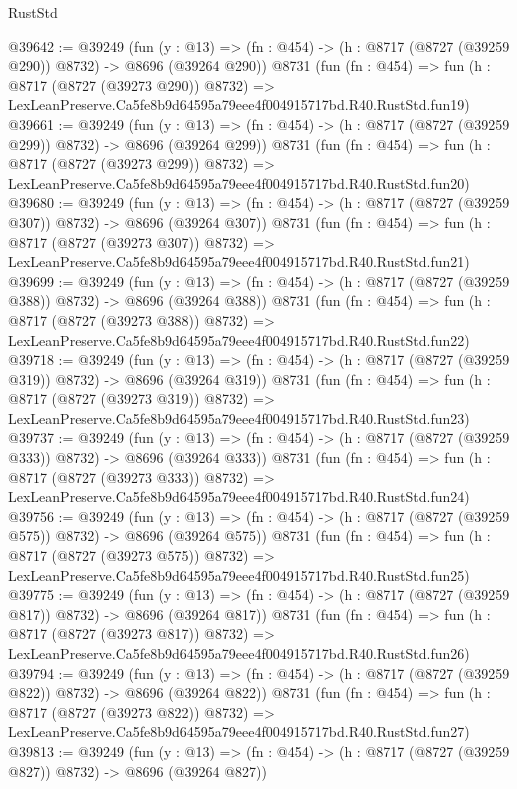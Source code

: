 \begin{lexlean}{RustStd}
\begin{coremodule}
@39642 := @39249
    (fun (y : @13) => (fn : @454) -> (h : @8717 (@8727 (@39259 @290)) @8732) -> @8696 (@39264 @290))
    @8731
    (fun (fn : @454) =>
    fun (h : @8717 (@8727 (@39273 @290)) @8732) =>
    LexLeanPreserve.Ca5fe8b9d64595a79eee4f004915717bd.R40.RustStd.fun19)
@39661 := @39249
    (fun (y : @13) => (fn : @454) -> (h : @8717 (@8727 (@39259 @299)) @8732) -> @8696 (@39264 @299))
    @8731
    (fun (fn : @454) =>
    fun (h : @8717 (@8727 (@39273 @299)) @8732) =>
    LexLeanPreserve.Ca5fe8b9d64595a79eee4f004915717bd.R40.RustStd.fun20)
@39680 := @39249
    (fun (y : @13) => (fn : @454) -> (h : @8717 (@8727 (@39259 @307)) @8732) -> @8696 (@39264 @307))
    @8731
    (fun (fn : @454) =>
    fun (h : @8717 (@8727 (@39273 @307)) @8732) =>
    LexLeanPreserve.Ca5fe8b9d64595a79eee4f004915717bd.R40.RustStd.fun21)
@39699 := @39249
    (fun (y : @13) => (fn : @454) -> (h : @8717 (@8727 (@39259 @388)) @8732) -> @8696 (@39264 @388))
    @8731
    (fun (fn : @454) =>
    fun (h : @8717 (@8727 (@39273 @388)) @8732) =>
    LexLeanPreserve.Ca5fe8b9d64595a79eee4f004915717bd.R40.RustStd.fun22)
@39718 := @39249
    (fun (y : @13) => (fn : @454) -> (h : @8717 (@8727 (@39259 @319)) @8732) -> @8696 (@39264 @319))
    @8731
    (fun (fn : @454) =>
    fun (h : @8717 (@8727 (@39273 @319)) @8732) =>
    LexLeanPreserve.Ca5fe8b9d64595a79eee4f004915717bd.R40.RustStd.fun23)
@39737 := @39249
    (fun (y : @13) => (fn : @454) -> (h : @8717 (@8727 (@39259 @333)) @8732) -> @8696 (@39264 @333))
    @8731
    (fun (fn : @454) =>
    fun (h : @8717 (@8727 (@39273 @333)) @8732) =>
    LexLeanPreserve.Ca5fe8b9d64595a79eee4f004915717bd.R40.RustStd.fun24)
@39756 := @39249
    (fun (y : @13) => (fn : @454) -> (h : @8717 (@8727 (@39259 @575)) @8732) -> @8696 (@39264 @575))
    @8731
    (fun (fn : @454) =>
    fun (h : @8717 (@8727 (@39273 @575)) @8732) =>
    LexLeanPreserve.Ca5fe8b9d64595a79eee4f004915717bd.R40.RustStd.fun25)
@39775 := @39249
    (fun (y : @13) => (fn : @454) -> (h : @8717 (@8727 (@39259 @817)) @8732) -> @8696 (@39264 @817))
    @8731
    (fun (fn : @454) =>
    fun (h : @8717 (@8727 (@39273 @817)) @8732) =>
    LexLeanPreserve.Ca5fe8b9d64595a79eee4f004915717bd.R40.RustStd.fun26)
@39794 := @39249
    (fun (y : @13) => (fn : @454) -> (h : @8717 (@8727 (@39259 @822)) @8732) -> @8696 (@39264 @822))
    @8731
    (fun (fn : @454) =>
    fun (h : @8717 (@8727 (@39273 @822)) @8732) =>
    LexLeanPreserve.Ca5fe8b9d64595a79eee4f004915717bd.R40.RustStd.fun27)
@39813 := @39249
    (fun (y : @13) => (fn : @454) -> (h : @8717 (@8727 (@39259 @827)) @8732) -> @8696 (@39264 @827))

\end{coremodule}
\end{lexlean}
